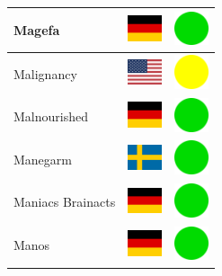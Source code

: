 \documentclass[12pt, a4paper, twoside]{report}
\begin{document}
\begin{center}
\begin{longtable}{|p{5cm}|p{2cm}|p{2cm}|}
 Magefa                                                     & \includegraphics[width=1cm]{../4x3/de} &   \includegraphics[width=1cm]{../likes/y} \\ \hline
 Malignancy                                                 & \includegraphics[width=1cm]{../4x3/us} &   \includegraphics[width=1cm]{../likes/m} \\ \hline
 Malnourished                                               & \includegraphics[width=1cm]{../4x3/de} &   \includegraphics[width=1cm]{../likes/y} \\ \hline
 Manegarm                                                   & \includegraphics[width=1cm]{../4x3/se} &   \includegraphics[width=1cm]{../likes/y} \\ \hline
 Maniacs Brainacts                                          & \includegraphics[width=1cm]{../4x3/de} &   \includegraphics[width=1cm]{../likes/y} \\ \hline
 Manos                                                      & \includegraphics[width=1cm]{../4x3/de} &   \includegraphics[width=1cm]{../likes/y} \\ \hline

\end{longtable}
\end{center}
\end{document}
